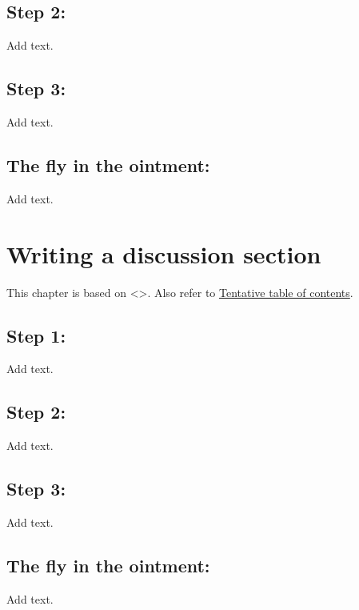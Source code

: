 \documentclass[
  letterpaper,
  DIV=11,
  numbers=noendperiod]{scrreprt}
\begin{document}
\section{Step 2:}\label{step-2-1}

Add text.

\section{Step 3:}\label{step-3-1}

Add text.

\section{The fly in the ointment:}\label{the-fly-in-the-ointment-6}

Add text.


\chapter{Writing a discussion
section}\label{writing-a-discussion-section}

This chapter is based on \textless{}\textgreater. Also refer to
\href{http://www.pmean.com/10/Contents.html}{Tentative table of
contents}.

\section{Step 1:}\label{step-1-2}

Add text.

\section{Step 2:}\label{step-2-2}

Add text.

\section{Step 3:}\label{step-3-2}

Add text.

\section{The fly in the ointment:}\label{the-fly-in-the-ointment-7}

Add text.

\end{document}
